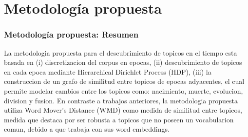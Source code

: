 \documentclass[
	spanish, %
	aspectratio=43, %
	hyperref={pdfencoding=auto,psdextra},
	xcolor={dvipsnames,table,usenames}
]{beamer}
\begin{document}
\begin{frame}



\end{frame}


\section{Metodología propuesta}
\begin{frame}

\frametitle{Metodología propuesta: Resumen}

La metodologia propuesta para el descubrimiento de topicos en el tiempo esta basada en (i) discretizacion del corpus en epocas, (ii) descubrimiento de topicos en cada epoca mediante Hierarchical Dirichlet Process (HDP), (iii) la construccion de un grafo de similitud entre topicos de epocas adyacentes, el cual permite modelar cambios entre los topicos como: nacimiento, muerte, evolucion, division y fusion. En contraste a trabajos anteriores, la metodologia propuesta utiliza Word Mover's Distance (WMD) como medida de similitud entre topicos, medida que destaca por ser robusta a topicos que no poseen un vocabularion comun, debido a que trabaja con sus word embeddings. 
\end{frame}
\end{document}
